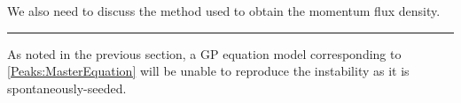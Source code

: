 We also need to discuss the method used to obtain the momentum flux density.

\hrule



As noted in the previous section, a GP equation model corresponding to \eqref{Peaks:MasterEquation} will be unable to reproduce the instability as it is spontaneously-seeded. 


% 
% 
% 
% 
% 
